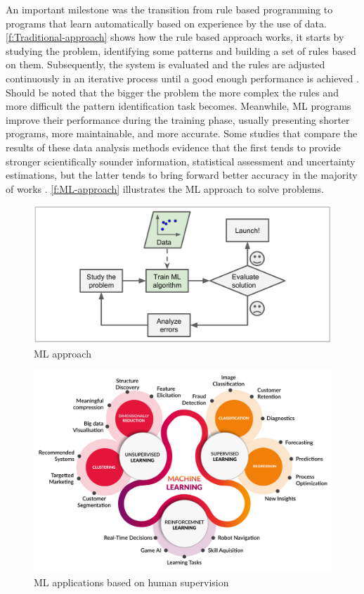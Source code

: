 An important milestone was the transition from rule based programming to programs that learn automatically based on experience by the use of data. \autoref{f:Traditional-approach} shows how the rule based approach works, it starts by studying the problem, identifying some patterns and building a set of rules based on them. Subsequently, the system is evaluated and the rules are adjusted continuously in an iterative process until a good enough performance is achieved \cite{geron2017}. Should be noted that the bigger the problem the more complex the rules and more difficult the pattern identification task becomes. Meanwhile, \ac{ML} programs improve their performance during the training phase, usually presenting shorter programs, more maintainable, and more accurate. Some studies that compare the results of these data analysis methods evidence that the first tends to provide stronger scientifically sounder information, statistical assessment and uncertainty estimations, but the latter tends to bring forward better accuracy in the majority of works \cite{geron2017,Ye2020}. \autoref{f:ML-approach} illustrates the \ac{ML} approach to solve problems.

\begin{figure}[t]
\centering
\includegraphics[width=14cm]{figures/Ch2/Ml-Approach.png}
\caption{ML approach \cite{geron2017}}
\label{f:ML-approach}
\end{figure}

\begin{figure}[h]
\centering
\includegraphics[width=\linewidth]{figures/Ch2/ML-Applications-by-type.png}
\caption{ML applications based on human supervision}
\label{f:ML-App-by-type}
\end{figure}

